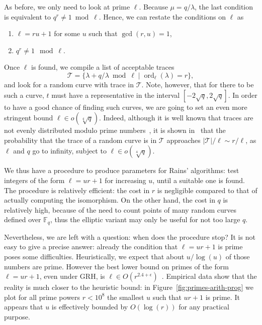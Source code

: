 \documentclass{mcom-l}
\theoremstyle{plain}
\theoremstyle{definition}
\newcommand{\abs}[1]{\left\vert#1\right\vert}
\DeclareMathOperator{\order}{ord} %
\newcommand{\F}{\ensuremath{\mathbb{F}}}
\newcounter{algorithm}
\begin{document}
As before, we only need to look at prime $\ell$. Because
$\mu=q/\lambda$, the last condition is equivalent to
$q^r\ne1\bmod\ell$. Hence, we can restate the conditions on $\ell$ as
\begin{enumerate}
\item $\ell = ru+1$ for some $u$ such that $\gcd(r,u)=1$,
\item $q^r\ne1\mod\ell$.
\end{enumerate}
Once $\ell$ is found, we compile a list of acceptable traces
\[\mathcal{T} = \{\lambda + q/\lambda \bmod\ell \;|\; \order_\ell(\lambda)=r\},\] %
and look for a random curve with trace in $\mathcal{T}$. %
Note, however, that for there to be such a curve, $t$ must have a
representative in the interval $[-2\sqrt{q},2\sqrt{q}]$. %
In order to have a good chance of finding such curves, we are going to
set an even more stringent bound $\ell\in o(\sqrt[4]{q})$. %
Indeed, although it is well known that traces are not evenly
distributed modulo prime numbers~\cite{lenstra87}, it is shown
in~\cite[Th.~1]{castryck+hubrechts13} that the probability that the
trace of a random curve is in $\mathcal{T}$ approaches
$\abs{\mathcal{T}}/\ell\sim r/\ell$, as $\ell$ and $q$ go to infinity,
subject to $\ell\in o(\sqrt[4]{q})$.  %

We thus have a procedure to produce parameters for Rains' algorithms:
test integers of the form $\ell=ur+1$ for increasing $u$, until a
suitable one is found. %
The procedure is relatively efficient: the cost in $r$ is negligible
compared to that of actually computing the isomorphism. %
On the other hand, the cost in $q$ is relatively high, because of the
need to count points of many random curves defined over $\F_q$, thus
the elliptic variant may only be useful for not too large $q$.

Nevertheless, we are left with a question: when does the procedure
stop? %
It is not easy to give a precise answer: already the condition that
$\ell=ur+1$ is prime poses some
difficulties. Heuristically, we expect that about
$u/\log(u)$ of those numbers are prime. However the best
lower bound on primes of the form $\ell=ur+1$, even under GRH, is
$\ell\in O(r^{2.4+\epsilon})$~\cite{heath1992zero}. Empirical data
show that the reality is much closer to the heuristic bound: in
Figure~\ref{fig:primes-arith-prog} we plot for all prime powers
$r<10^8$ the smallest $u$ such that $ur+1$ is prime. It appears that
$u$ is effectively bounded by $O(\log(r))$ for any practical purpose.
\end{document}
